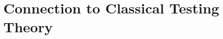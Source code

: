 \documentclass[12pt,epsfig]{article}
\begin{document}







\section{Connection to Classical Testing Theory}
\label{Sec:Connection}
\end{document}
